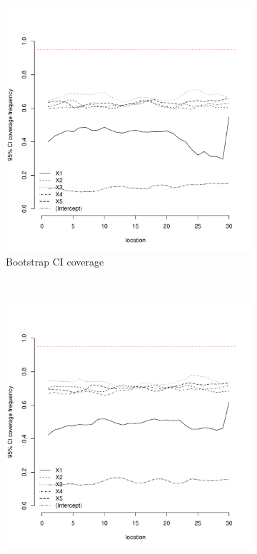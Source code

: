 \documentclass[authoryear, review, 11pt]{elsarticle}
\begin{document}
\begin{figure}
	\vspace{-30mm}
	\centering
	\begin{subfigure}[b]{0.45\textwidth}
	\centering
		\includegraphics[width=\textwidth]{../../figures/simulation/15.18.profile_bootstrap_coverage.pdf}
		\caption{Bootstrap CI coverage}
	\end{subfigure}%
	~ %
	\begin{subfigure}[b]{0.45\textwidth}
	\centering
		\includegraphics[width=\textwidth]{../../figures/simulation/15.18.profile_se_coverage.pdf}

\end{subfigure}
\end{figure}
\end{document}

